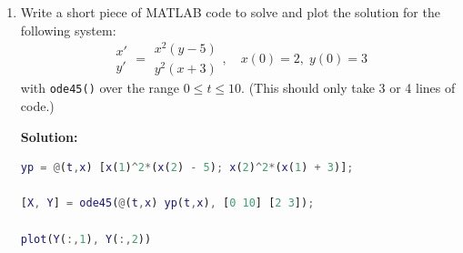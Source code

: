 \documentclass[letterpaper, fontsize=12pt]{scrartcl} %
\numberwithin{equation}{section} %
\numberwithin{figure}{section} %
\numberwithin{table}{section} %
\begin{document}
\begin{enumerate}
\begin{enumerate}[label = (\alph*)]
\item Write a short piece of MATLAB code to solve and plot the solution for the following system:
\[ \begin{matrix} x' \\ y' \end{matrix} = \begin{matrix} x^2(y - 5) \\ y^2(x +3) \end{matrix}, \quad x(0) = 2, \;y(0) = 3 \]
with \texttt{ode45()} over the range $0 \leq t \leq 10$. (This should only take 3 or 4 lines of code.) 

\par \textbf{Solution:} 

\begin{lstlisting}[language=Matlab]
yp = @(t,x) [x(1)^2*(x(2) - 5); x(2)^2*(x(1) + 3)];

[X, Y] = ode45(@(t,x) yp(t,x), [0 10] [2 3]);

plot(Y(:,1), Y(:,2))

\end{lstlisting}


\end{enumerate}


\end{enumerate}

\end{document}
